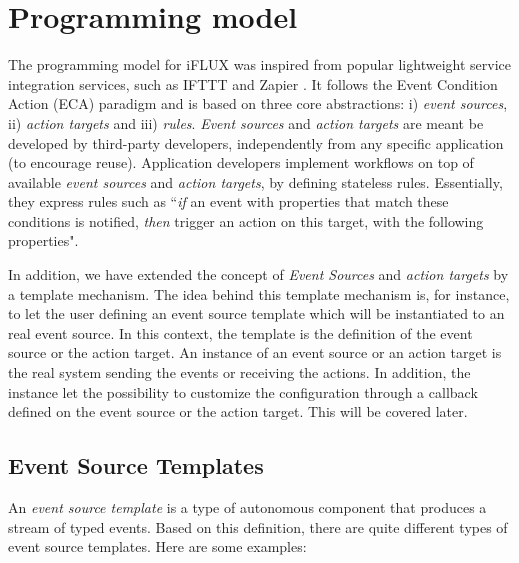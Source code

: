 \section{Programming model}

The programming model for iFLUX was inspired from popular lightweight service integration services, such as IFTTT \cite{ifttt}  and Zapier \cite{zapier}. It follows the Event Condition Action (ECA) paradigm \cite{bailey2004event,qiao2007developing,papamarkos2003event} and is based on three core abstractions: i) \emph{event sources}, ii) \emph{action targets} and iii) \emph{rules}. \emph{Event sources} and \emph{action targets} are meant be developed by third-party developers, independently from any specific application (to encourage reuse). Application developers implement workflows on top of available \emph{event sources} and \emph{action targets}, by defining stateless rules. Essentially, they express rules such as ``\emph{if} an event with properties that match these conditions is notified, \emph{then} trigger an action on this target, with the following properties".

In addition, we have extended the concept of \emph{Event Sources} and \emph{action targets} by a template mechanism. The idea behind this template mechanism is, for instance, to let the user defining an event source template which will be instantiated to an real event source. In this context, the template is the definition of the event source or the action target. An instance of an event source or an action target is the real system sending the events or receiving the actions. In addition, the instance let the possibility to customize the configuration through a callback defined on the event source or the action target. This will be covered later.

\subsection{Event Source Templates}
\label{sec:est}

An \emph{event source template} is a type of autonomous component that produces a stream of typed events. Based on this definition, there are quite different types of event source templates. Here are some examples:

